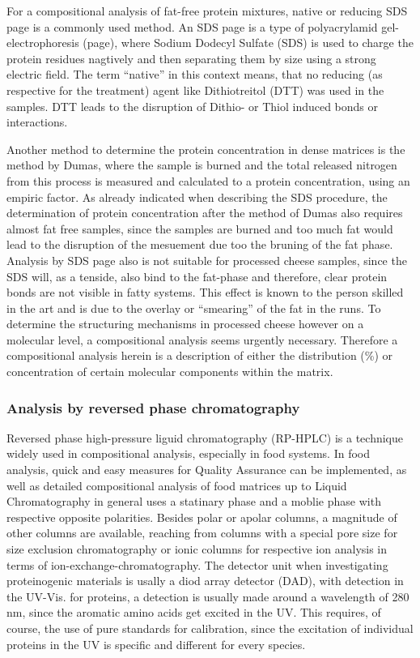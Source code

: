 \documentclass[
]{article}
\begin{document}
For a compositional analysis of fat-free protein mixtures, native or
reducing SDS page is a commonly used method. An SDS page is a type of
polyacrylamid gel-electrophoresis (page), where Sodium Dodecyl Sulfate
(SDS) is used to charge the protein residues nagtively and then
separating them by size using a strong electric field. The term
``native'' in this context means, that no reducing (as respective for
the treatment) agent like Dithiotreitol (DTT) was used in the samples.
DTT leads to the disruption of Dithio- or Thiol induced bonds or
interactions.

Another method to determine the protein concentration in dense matrices
is the method by Dumas, where the sample is burned and the total
released nitrogen from this process is measured and calculated to a
protein concentration, using an empiric factor. As already indicated
when describing the SDS procedure, the determination of protein
concentration after the method of Dumas also requires almost fat free
samples, since the samples are burned and too much fat would lead to the
disruption of the mesuement due too the bruning of the fat phase.
Analysis by SDS page also is not suitable for processed cheese samples,
since the SDS will, as a tenside, also bind to the fat-phase and
therefore, clear protein bonds are not visible in fatty systems. This
effect is known to the person skilled in the art and is due to the
overlay or ``smearing'' of the fat in the runs. To determine the
structuring mechanisms in processed cheese however on a molecular level,
a compositional analysis seems urgently necessary. Therefore a
compositional analysis herein is a description of either the
distribution (\%) or concentration of certain molecular components
within the matrix.

\subsubsection{Analysis by reversed phase chromatography}

Reversed phase high-pressure liguid chromatography (RP-HPLC) is a
technique widely used in compositional analysis, especially in food
systems. In food analysis, quick and easy measures for Quality Assurance
can be implemented, as well as detailed compositional analysis of food
matrices up to Liquid Chromatography in general uses a statinary phase
and a moblie phase with respective opposite polarities. Besides polar or
apolar columns, a magnitude of other columns are available, reaching
from columns with a special pore size for size exclusion chromatography
or ionic columns for respective ion analysis in terms of
ion-exchange-chromatography. The detector unit when investigating
proteinogenic materials is usally a diod array detector (DAD), with
detection in the UV-Vis. for proteins, a detection is usually made
around a wavelength of 280 nm, since the aromatic amino acids get
excited in the UV. This requires, of course, the use of pure standards
for calibration, since the excitation of individual proteins in the UV
is specific and different for every species.
\end{document}
